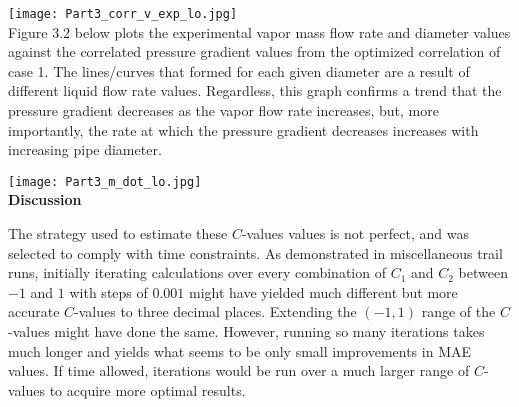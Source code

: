 \texttt{[image: Part3\_corr\_v\_exp\_lo.jpg]}\\

Figure 3.2 below plots the experimental vapor mass flow rate and diameter values against the correlated pressure gradient values from the optimized correlation of case 1. The lines/curves that formed for each given diameter are a result of different liquid flow rate values. Regardless, this graph confirms a trend that the pressure gradient decreases as the vapor flow rate increases, but, more importantly, the rate at which the pressure gradient decreases increases with increasing pipe diameter.

\texttt{[image: Part3\_m\_dot\_lo.jpg]}\\

\textbf{Discussion}

The strategy used to estimate these \(C\)-values values is not perfect, and was selected to comply with time constraints. As demonstrated in miscellaneous trail runs, initially iterating calculations over every combination of \(C_1\) and \(C_2\) between \(-1\) and \(1\) with steps of \(0.001\) might have yielded much different but more accurate \(C\)-values to three decimal places. Extending the \((-1,1)\) range of the \(C\)-values might have done the same. However, running so many iterations takes much longer and yields what seems to be only small improvements in MAE values. If time allowed, iterations would be run over a much larger range of \(C\)-values to acquire more optimal results. 



